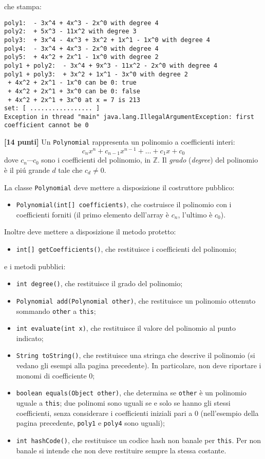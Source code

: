 \documentclass{article}[10pt]
\newcounter{esnu}
\newenvironment{esercizio}{\medskip \noindent {\bf Esercizio\addtocounter{esnu}{1} \arabic{esnu}}}{}
\begin{document}
\noindent
che stampa:
%
{\small
\begin{verbatim}
poly1:  - 3x^4 + 4x^3 - 2x^0 with degree 4
poly2:  + 5x^3 - 11x^2 with degree 3
poly3:  + 3x^4 - 4x^3 + 3x^2 + 1x^1 - 1x^0 with degree 4
poly4:  - 3x^4 + 4x^3 - 2x^0 with degree 4
poly5:  + 4x^2 + 2x^1 - 1x^0 with degree 2
poly1 + poly2:  - 3x^4 + 9x^3 - 11x^2 - 2x^0 with degree 4
poly1 + poly3:  + 3x^2 + 1x^1 - 3x^0 with degree 2
 + 4x^2 + 2x^1 - 1x^0 can be 0: true
 + 4x^2 + 2x^1 + 3x^0 can be 0: false
 + 4x^2 + 2x^1 + 3x^0 at x = 7 is 213
set: [ ................. ]
Exception in thread "main" java.lang.IllegalArgumentException: first coefficient cannot be 0
\end{verbatim}
}

\begin{esercizio}
\textbf{[14 punti]}
Un \texttt{Polynomial} rappresenta un polinomio a coefficienti interi:
\[
  c_nx^n+c_{n-1}x^{n-1}+\ldots+c_1x+c_0
\]
dove $c_n\cdots c_0$ sono i coefficienti del polinomio, in $\mathbb{Z}$.
Il \emph{grado} (\emph{degree}) del polinomio \`e il pi\'u grande $d$ tale che $c_d\not=0$.

La classe \texttt{Polynomial} deve mettere a disposizione il costruttore pubblico:
%
\begin{itemize}
\item \texttt{Polynomial(int[] coefficients)}, che costruisce il polinomio con i coefficienti forniti
      (il primo elemento dell'array \`e $c_n$, l'ultimo \`e $c_0$).
\end{itemize}
%
Inoltre deve mettere a disposizione il metodo protetto:
%
\begin{itemize}
\item \texttt{int[] getCoefficients()}, che restituisce i coefficienti del polinomio;
\end{itemize}
%
e i metodi pubblici:
%
\begin{itemize}
\item \texttt{int degree()}, che restituisce il grado del polinomio;
\item \texttt{Polynomial add(Polynomial other)}, che restituisce un polinomio ottenuto sommando
      \texttt{other} a \texttt{this};
\item \texttt{int evaluate(int x)}, che restituisce il valore del polinomio al punto indicato;
\item \texttt{String toString()}, che restituisce una stringa che descrive il polinomio
      (si vedano gli esempi alla pagina precedente).
      In particolare, non deve riportare i monomi di coefficiente 0;
\item \texttt{boolean equals(Object other)}, che determina se \texttt{other} \`e un polinomio uguale
      a \texttt{this}; due polinomi sono uguali se e solo se hanno gli stessi coefficienti, senza considerare
      i coefficienti iniziali pari a 0 (nell'esempio della pagina precedente,
      \texttt{poly1} e \texttt{poly4} sono uguali);
\item \texttt{int hashCode()}, che restituisce un codice hash non banale per \texttt{this}. Per non banale
      si intende che non deve restituire sempre la stessa costante.
\end{itemize}
%
\end{esercizio}
\end{document}
